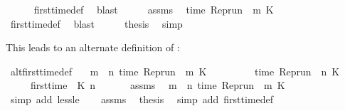 \begin{isabellebody}
\ \ \ \ \isamarkupfalse%
\ first{\isacharunderscore}time{\isacharunderscore}def\ \isamarkupfalse%
\ blast\isanewline
\ \ \isamarkupfalse%
\ \isamarkupfalse%
\ assms\ \isamarkupfalse%
\ {\isacartoucheopen}time\ {\isacharparenleft}{\isacharparenleft}Rep{\isacharunderscore}run\ {\isasymrho}{\isacharparenright}\ m\ K{\isacharparenright}\ {\isasymnoteq}\ {\isasymtau}{\isacartoucheclose}\isanewline
\ \ \ \ \isamarkupfalse%
\ first{\isacharunderscore}time{\isacharunderscore}def\ \isamarkupfalse%
\ blast\isanewline
\ \ \isamarkupfalse%
\ \isamarkupfalse%
\ {\isacharquery}thesis\ \isamarkupfalse%
\ simp\isanewline
{}\isamarkupfalse%
%
\endisatagproof
{\isafoldproof}%
%
\isadelimproof
%
\endisadelimproof
%
\begin{isamarkuptext}%
This leads to an alternate definition of :%
\end{isamarkuptext}\isamarkuptrue%
\isamarkupfalse%
\ alt{\isacharunderscore}first{\isacharunderscore}time{\isacharunderscore}def{\isacharcolon}\isanewline
\ \ \ {\isacartoucheopen}{\isasymforall}m\ {\isacharless}\ n{\isachardot}\ time\ {\isacharparenleft}{\isacharparenleft}Rep{\isacharunderscore}run\ {\isasymrho}{\isacharparenright}\ m\ K{\isacharparenright}\ {\isacharless}\ {\isasymtau}{\isacartoucheclose}\isanewline
\ \ \ \ \ \ \ {\isacartoucheopen}time\ {\isacharparenleft}{\isacharparenleft}Rep{\isacharunderscore}run\ {\isasymrho}{\isacharparenright}\ n\ K{\isacharparenright}\ {\isacharequal}\ {\isasymtau}{\isacartoucheclose}\isanewline
\ \ \ \ \ {\isacartoucheopen}first{\isacharunderscore}time\ {\isasymrho}\ K\ n\ {\isasymtau}{\isacartoucheclose}\isanewline
%
\isadelimproof
%
\endisadelimproof
%
\isatagproof
{}\isamarkupfalse%
\ {\isacharminus}\isanewline
\ \ \isamarkupfalse%
\ assms{\isacharparenleft}{}{\isacharparenright}\ \isamarkupfalse%
\ {\isacartoucheopen}{\isasymforall}m\ {\isacharless}\ n{\isachardot}\ time\ {\isacharparenleft}{\isacharparenleft}Rep{\isacharunderscore}run\ {\isasymrho}{\isacharparenright}\ m\ K{\isacharparenright}\ {\isasymnoteq}\ {\isasymtau}{\isacartoucheclose}\isanewline
\ \ \ \ \isamarkupfalse%
\ {\isacharparenleft}simp\ add{\isacharcolon}\ less{\isacharunderscore}le{\isacharparenright}\isanewline
\ \ \isamarkupfalse%
\ assms{\isacharparenleft}{}{\isacharparenright}\ \isamarkupfalse%
\ {\isacharquery}thesis\ \isamarkupfalse%
\ {\isacharparenleft}simp\ add{\isacharcolon}\ first{\isacharunderscore}time{\isacharunderscore}def{\isacharparenright}\isanewline
{}\isamarkupfalse%
%
\endisatagproof
{\isafoldproof}%
%
\isadelimproof
\isanewline
%
\endisadelimproof
%
\isadelimtheory
\isanewline
%
\endisadelimtheory
%
\isatagtheory
{}\isamarkupfalse%
%
\endisatagtheory
{\isafoldtheory}%
%
\isadelimtheory
%
\endisadelimtheory
%
\end{isabellebody}%
